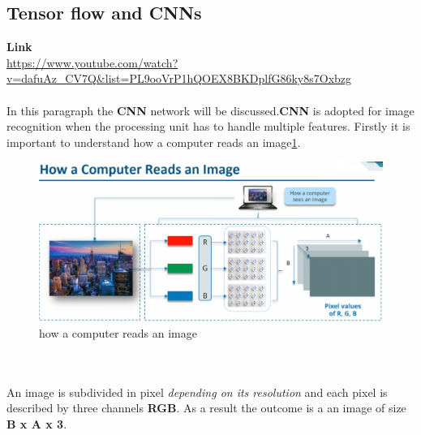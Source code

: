 \documentclass[11pt]{article}
\begin{document}
\subsection{Tensor flow and CNNs}
\textbf{Link}\\
\url{https://www.youtube.com/watch?v=dafuAz_CV7Q&list=PL9ooVrP1hQOEX8BKDplfG86ky8s7Oxbzg}\\\\
In this paragraph the \textbf{CNN}  network will be discussed.\textbf{CNN} is adopted for image recognition when the processing unit has to handle multiple features. Firstly it is important to understand how a computer reads an image\ref{fig:CNN1}.
\begin{figure}[h]
\centering
\captionsetup{justification=centering}
\includegraphics[width=0.9\linewidth]{CNN1.pdf}
\caption{how a computer reads an image }
\label{fig:CNN1}
\end{figure}
\\\\
An image is subdivided in pixel \textit{depending on its resolution} and each pixel is described by three channels \textbf{RGB}. As a result the outcome is a an image of size \textbf{B x A x 3}.
\end{document}
